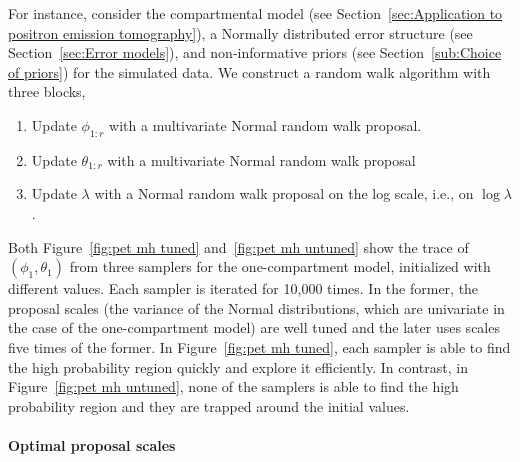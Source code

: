 For instance, consider the \pet compartmental model (see
Section~\ref{sec:Application to positron emission tomography}), a Normally
distributed error structure (see Section~\ref{sec:Error models}), and
non-informative priors (see Section~\ref{sub:Choice of priors}) for the
simulated data. We construct a random walk algorithm with three blocks,
\begin{enumerate}
  \item Update $\phi_{1:r}$ with a multivariate Normal random walk proposal.
  \item Update $\theta_{1:r}$ with a multivariate Normal random walk proposal
  \item Update $\lambda$ with a Normal random walk proposal on the log scale,
    i.e., on $\log\lambda$.
\end{enumerate}
Both Figure~\ref{fig:pet mh tuned} and~\ref{fig:pet mh untuned} show the
trace of $(\phi_1, \theta_1)$ from three samplers for the one-compartment
model, initialized with different values. Each sampler is iterated for 10,000
times. In the former, the proposal scales (the variance of the Normal
distributions, which are univariate in the case of the one-compartment model)
are well tuned and the later uses scales five times of the former. In
Figure~\ref{fig:pet mh tuned}, each sampler is able to find the high
probability region quickly and explore it efficiently. In contrast, in
Figure~\ref{fig:pet mh untuned}, none of the samplers is able to find the
high probability region and they are trapped around the initial values.




\paragraph{Optimal proposal scales}


